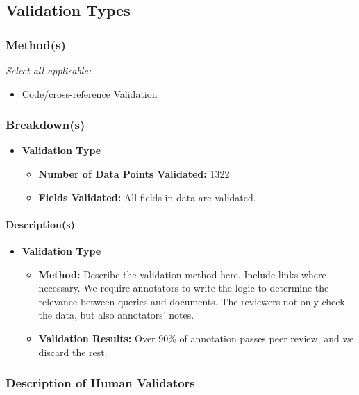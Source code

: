 \subsection{Validation Types}
\subsubsection{Method(s)}
\textit{Select all applicable:}
\begin{itemize}
    \item Code/cross-reference Validation
\end{itemize}

\subsubsection{Breakdown(s)}
\begin{itemize}
    \item \textbf{Validation Type}
    \begin{itemize}
        \item \textbf{Number of Data Points Validated:} 1322
        \item \textbf{Fields Validated:} All fields in data are validated.
    \end{itemize}
\end{itemize}

\paragraph{Description(s)}
\begin{itemize}
    \item \textbf{Validation Type}
    \begin{itemize}
        \item \textbf{Method:} Describe the validation method here. Include links where necessary. We require annotators to write the logic to determine the relevance between queries and documents. The reviewers not only check the data, but also annotators' notes.
        \item \textbf{Validation Results:} Over 90\% of annotation passes peer review, and we discard the rest.
    \end{itemize}
\end{itemize}

\subsubsection{Description of Human Validators}
